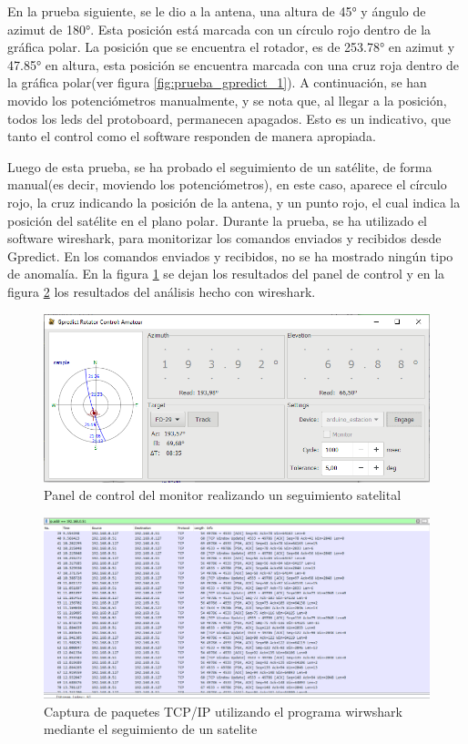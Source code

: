 En la prueba siguiente, se le dio a la antena, una altura de 45° y ángulo de azimut de 180°. Esta posición está marcada con un círculo rojo dentro de la gráfica polar. La posición que se encuentra el rotador, es de 253.78° en azimut y 47.85° en altura, esta posición se encuentra marcada con una cruz roja dentro de la gráfica polar(ver figura \ref{fig:prueba_gpredict_1}). A continuación, se han movido los potenciómetros manualmente,  y se nota que, al llegar a la posición, todos los leds del protoboard, permanecen apagados. Esto es un indicativo, que tanto el control como el software responden de manera apropiada. 

 
Luego de esta prueba, se ha probado el seguimiento de un satélite, de forma manual(es decir, moviendo los potenciómetros), en este caso, aparece el círculo rojo, la cruz indicando la posición de la antena, y un punto rojo, el cual indica la posición del satélite en el plano polar. Durante la prueba, se ha utilizado el software wireshark, para monitorizar los comandos enviados y recibidos desde Gpredict. En los comandos enviados y recibidos, no se ha mostrado ningún tipo de anomalía. En la figura \ref{fig:prueba_gpr_seg_sat} se dejan los resultados del panel de control  y en la figura \ref{fig:wireshark_gpr} los resultados del análisis hecho con wireshark. 



\begin{figure}[ht]
	\centering
	\includegraphics[scale=0.5]{gpredict_seguimiento_sat} 
	\caption{Panel de control del monitor realizando un seguimiento satelital} 
	\label{fig:prueba_gpr_seg_sat}	
\end{figure}

\begin{figure}[ht]
	\includegraphics[scale=0.5]{wireshark_gpredict} 
	\caption{Captura de paquetes TCP/IP utilizando el programa wirwshark mediante el seguimiento de un satelite} 
	\label{fig:wireshark_gpr}
\end{figure}



